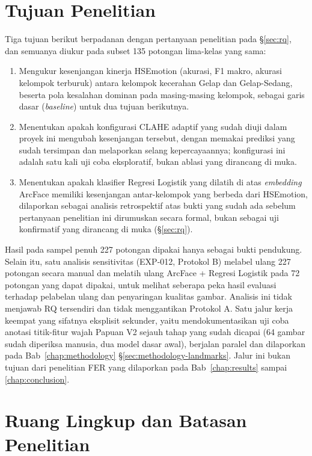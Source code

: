\section{Tujuan Penelitian}
\label{sec:objectives}

Tiga tujuan berikut berpadanan dengan pertanyaan penelitian pada \S\ref{sec:rq}, dan semuanya diukur pada subset 135 potongan lima-kelas yang sama:

\begin{enumerate}
  \item Mengukur kesenjangan kinerja HSEmotion (akurasi, F1 makro, akurasi kelompok terburuk) antara kelompok kecerahan Gelap dan Gelap-Sedang, beserta pola kesalahan dominan pada masing-masing kelompok, sebagai garis dasar (\textit{baseline}) untuk dua tujuan berikutnya.
  \item Menentukan apakah konfigurasi CLAHE adaptif yang sudah diuji dalam proyek ini mengubah kesenjangan tersebut, dengan memakai prediksi yang sudah tersimpan dan melaporkan selang kepercayaannya; konfigurasi ini adalah satu kali uji coba eksploratif, bukan ablasi yang dirancang di muka.
  \item Menentukan apakah klasifier Regresi Logistik yang dilatih di atas \textit{embedding} ArcFace memiliki kesenjangan antar-kelompok yang berbeda dari HSEmotion, dilaporkan sebagai analisis retrospektif atas bukti yang sudah ada sebelum pertanyaan penelitian ini dirumuskan secara formal, bukan sebagai uji konfirmatif yang dirancang di muka (\S\ref{sec:rq}).
\end{enumerate}

Hasil pada sampel penuh 227 potongan dipakai hanya sebagai bukti pendukung. Selain itu, satu analisis sensitivitas (EXP-012, Protokol B) melabel ulang 227 potongan secara manual dan melatih ulang ArcFace + Regresi Logistik pada 72 potongan yang dapat dipakai, untuk melihat seberapa peka hasil evaluasi terhadap pelabelan ulang dan penyaringan kualitas gambar. Analisis ini tidak menjawab RQ\label{abbr:RQ} tersendiri dan tidak menggantikan Protokol A. Satu jalur kerja keempat yang sifatnya eksplisit sekunder, yaitu mendokumentasikan uji coba anotasi titik-fitur wajah Papuan V2 sejauh tahap yang sudah dicapai (64 gambar sudah diperiksa manusia, dua model dasar awal), berjalan paralel dan dilaporkan pada Bab~\ref{chap:methodology} \S\ref{sec:methodology-landmarks}. Jalur ini bukan tujuan dari penelitian FER yang dilaporkan pada Bab~\ref{chap:results} sampai \ref{chap:conclusion}.

\section{Ruang Lingkup dan Batasan Penelitian}
\label{sec:scope}


